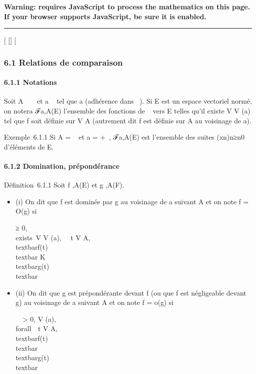 \textbf{Warning: 
requires JavaScript to process the mathematics on this page.\\ If your
browser supports JavaScript, be sure it is enabled.}

\begin{center}\rule{3in}{0.4pt}\end{center}

{[}
{[}{]}
{[}

\subsubsection{6.1 Relations de comparaison}

\paragraph{6.1.1 Notations}

Soit A \subset~ ~ et a \in\overline{}~ tel que a
\in\overlineA (adhérence dans
\overline{}~). Si E est un espace vectoriel normé, on
notera ℱa,A(E) l'ensemble des fonctions de ~ vers E telles
qu'il existe V \in V (a) tel que f soit définie sur V \bigcap A (autrement dit f
est définie sur A au voisinage de a).

Exemple~6.1.1 Si A = ~ et a = +\infty~, ℱa,A(E) est l'ensemble des
suites (xn)n≥n0 d'éléments de E.

\paragraph{6.1.2 Domination, prépondérance}

Définition~6.1.1 Soit f ,A(E) et g ,A(F).

\begin{itemize}
\item
  (i) On dit que f est dominée par g au voisinage de a suivant A et on
  note f = O(g) si

  \existsK ≥ 0, \\exists~V \in V
  (a), \forall~~t \in V \bigcap A,
  \\textbar{}f(t)\\textbar{} \leq
  K\\textbar{}g(t)\\textbar{}
\item
  (ii) On dit que g est prépondérante devant f (ou que f est négligeable
  devant g) au voisinage de a suivant A et on note f = o(g) si

  \forall~~\epsilon \textgreater{} 0,
  \existsV \in V (a), \\forall~~t \in V
  \bigcap A, \\textbar{}f(t)\\textbar{} \leq
  \epsilon\\textbar{}g(t)\\textbar{}
\end{itemize}

